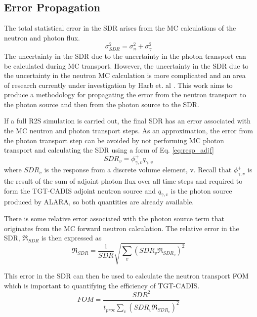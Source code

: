 \subsection{Error Propagation}\label{sec:error}
The total statistical error in the SDR
arises from the MC calculations of the neutron and photon flux.
\begin{equation}\label{eq:toterr}
	\sigma_{SDR}^{2} = \sigma_n^2 + \sigma_{\gamma}^2
\end{equation}
The uncertainty in the SDR due to the uncertainty in the photon transport can
be calculated during MC transport. However, the 
uncertainty in the SDR due to the uncertainty in the neutron MC
calculation is more complicated and an area of research currently under investigation by Harb et.
al \cite{harb} .  This work aims to produce a methodology for propagating the error from the
neutron transport to the photon source and then from the photon source to the
SDR.

If a full R2S simulation is carried out, the final SDR has an error associated
with the MC neutron and photon transport steps.  As an approximation, the error from the photon transport
step can be avoided by not performing MC photon transport and calculating the
SDR using a form of Eq. \ref{eq:resp_adjf}
\begin{equation}\label{eq:resp_v}
	SDR_v = \phi_{\gamma, v}^{+} q_{\gamma, v}
\end{equation}
where $SDR_v$ is the response from a discrete volume element, v.
Recall that $\phi_{\gamma, v}^{+}$ is the result of the sum of adjoint photon flux 
over all time steps and required to form the TGT-CADIS adjoint neutron source
and $q_{\gamma, v}$ is the photon source produced by ALARA, so both quantities
are already available.

There is some relative error associated with the photon source term that
originates from the MC forward neutron calculation.  
The relative error in the
SDR, $\Re_{SDR}$ is then expressed as 
\begin{equation}\label{eq:err}
	\Re_{SDR} = \frac{1}{SDR} \sqrt{\sum_v{(SDR_v \Re_{SDR_v})^2}}
\end{equation}

This error in the SDR can then be used to calculate the neutron transport
FOM \cite{eb_prelim}
which is important to quantifying the efficiency of TGT-CADIS.
\begin{equation}\label{eq:fom}
	FOM = \frac{SDR^2}{t_{proc}\sum_v{(SDR_v \Re_{SDR_v})^2}}
\end{equation}




